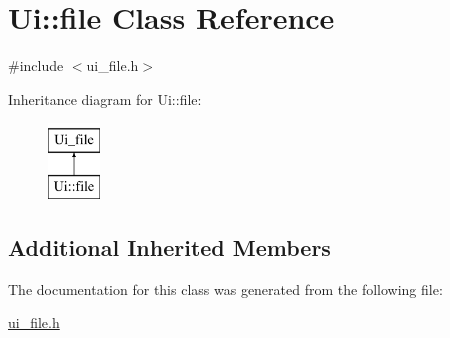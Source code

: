 \hypertarget{classUi_1_1file}{\section{Ui\-:\-:file Class Reference}
\label{classUi_1_1file}
}


{\ttfamily \#include $<$ui\-\_\-file.\-h$>$}

Inheritance diagram for Ui\-:\-:file\-:\begin{figure}[H]
\begin{center}
\leavevmode
\includegraphics[height=2.000000cm]{classUi_1_1file}
\end{center}
\end{figure}
\subsection*{Additional Inherited Members}


The documentation for this class was generated from the following file\-:\begin{DoxyCompactItemize}
\item 
\hyperlink{ui__file_8h}{ui\-\_\-file.\-h}\end{DoxyCompactItemize}
